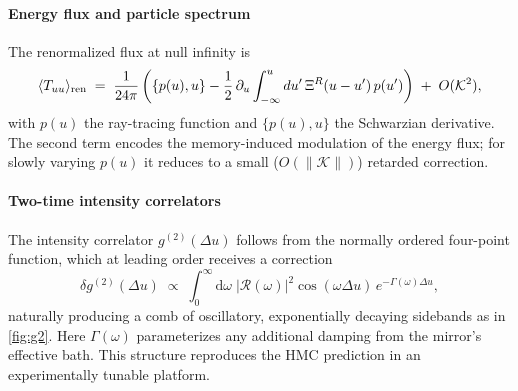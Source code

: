 \documentclass[a4paper,11pt]{article}
\newcommand{\HMC}{\textsc{HMC}\xspace}
\theoremstyle{plain}
\theoremstyle{definition}
\theoremstyle{remark}
\begin{document}
\paragraph{Energy flux and particle spectrum}
The renormalized flux at null infinity is
\begin{equation}
\langle T_{uu}\rangle_{\rm ren}\;=\;\frac{1}{24\pi}\left(\{p(u),u\}-\frac{1}{2}\,\partial_u \int_{-\infty}^u du'\,\Xi^R(u-u')\,p(u')\right)\;+\;O(\mathcal{K}^2),
\end{equation}
with $p(u)$ the ray-tracing function and $\{p(u),u\}$ the Schwarzian derivative. The second term encodes the memory-induced modulation of the energy flux; for slowly varying $p(u)$ it reduces to a small ($O(\|\mathcal{K}\|)$) retarded correction.

\paragraph{Two-time intensity correlators}
The intensity correlator $g^{(2)}(\Delta u)$ follows from the normally ordered four-point function, which at leading order receives a correction
\begin{equation}
\delta g^{(2)}(\Delta u)\;\propto\; \int_{0}^{\infty} \mathrm{d}\omega\;\left|\mathcal{R}(\omega)\right|^2\cos(\omega\Delta u)\,e^{-\Gamma(\omega)\Delta u},
\end{equation}
naturally producing a comb of oscillatory, exponentially decaying sidebands as in \cref{fig:g2}. Here $\Gamma(\omega)$ parameterizes any additional damping from the mirror's effective bath. This structure reproduces the \HMC{} prediction in an experimentally tunable platform.
\end{document}
